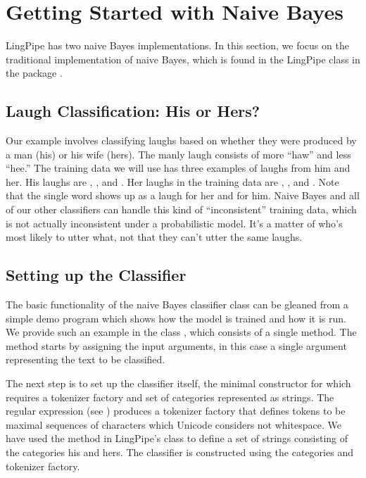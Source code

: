\section{Getting Started with Naive Bayes}

LingPipe has two naive Bayes implementations.  In this section, we
focus on the traditional implementation of naive Bayes, which is found
in the LingPipe class  in the package
.  

\subsection{Laugh Classification: His or Hers?}

Our example involves classifying laughs based on whether they were
produced by a man (his) or his wife (hers).  The manly laugh consists
of more ``haw'' and less ``hee.''  The training data we will use has
three examples of laughs from him and her.  His laughs are
, , and
.  Her laughs in the training data are
, , and
.  Note that the single word 
shows up as a laugh for her and for him.  Naive Bayes and all of our
other classifiers can handle this kind of ``inconsistent'' training
data, which is not actually inconsistent under a probabilistic model.
It's a matter of who's most likely to utter what, not that they
can't utter the same laughs.

\subsection{Setting up the Classifier}

The basic functionality of the naive Bayes classifier class can be
gleaned from a simple demo program which shows how the model is
trained and how it is run.  We provide such an example in the class
, which consists of a single  method.
The method starts by assigning the input arguments, in this case
a single argument representing the text to be classified.
%

The next step is to set up the classifier itself, the
minimal constructor for which requires a tokenizer factory
and set of categories represented as strings.
%
%
The regular expression  (see
) produces a tokenizer factory that
defines tokens to be maximal sequences of characters which Unicode
considers not whitespace.  We have used the  method in
LingPipe's  class to define a set of strings
consisting of the categories his and hers.  The classifier is
constructed using the categories and tokenizer factory.


